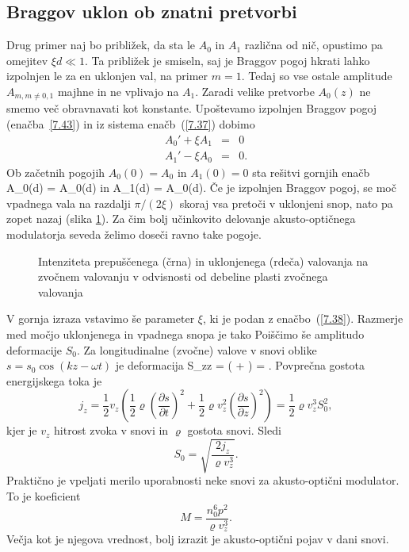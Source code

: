 \subsection*{Braggov uklon ob znatni pretvorbi}
Drug primer naj bo približek, da sta le $A_{0}$ in $A_{1}$ različna od nič, 
opustimo pa omejitev $\xi d\ll 1$. Ta približek je smiseln, saj je 
Braggov pogoj hkrati lahko izpolnjen le za en uklonjen val, na
primer $m=1$. Tedaj so vse ostale amplitude $A_{m, m\ne0,1}$
majhne in ne vplivajo na $A_{1}$. Zaradi velike pretvorbe 
$A_{0}(z)$ ne smemo več obravnavati kot konstante. Upoštevamo 
izpolnjen Braggov pogoj (enačba~\ref{7.43}) in iz sistema enačb~(\ref{7.37})
dobimo
\begin{eqnarray}
A_{0}'+\xi A_{1} & = & 0\nonumber \\
A_{1}'-\xi A_{0} & = & 0.
\end{eqnarray}
Ob začetnih pogojih $A_{0}(0)=A_{0}$ in $A_{1}(0)=0$ sta rešitvi gornjih enačb
\beq
A_{0}(d) = A_{0}\cos (\xi d)
\eeq
in
\beq
A_{1}(d) = A_{0}\sin (\xi d).
\eeq
Če je izpolnjen Braggov pogoj, se moč vpadnega vala na razdalji $\pi/(2\xi)$
skoraj vsa pretoči v uklonjeni snop, nato pa zopet nazaj (slika \ref{s7.10}).
Za čim bolj učinkovito delovanje akusto-optičnega modulatorja seveda
želimo doseči ravno take pogoje.
\begin{figure}[h]
\centering
\def\svgwidth{90truemm} 

\caption{Intenziteta prepuščenega (črna) in uklonjenega (rdeča) valovanja na zvočnem valovanju v
odvisnosti od debeline plasti zvočnega valovanja}
\label{s7.10}
\end{figure}

V gornja izraza vstavimo še parameter $\xi$, ki je podan z enačbo~(\ref{7.38}).
Razmerje med močjo uklonjenega in vpadnega snopa je tako
Poiščimo še amplitudo deformacije $S_0$. Za longitudinalne (zvočne) valove v snovi oblike 
$s = s_0 \cos(kz - \omega t)$ je deformacija 
\beq
S_{zz} = \bigl( + 
\bigr) = .
\eeq
Povprečna gostota energijskega toka je 
\begin{equation}
j_{z}=
\frac{1}{2}v_z \left(\frac{1}{2} \varrho \left(\frac{\partial s}{\partial t}\right)^2
+ \frac{1}{2} \varrho v_z^2\left(\frac{\partial s}{\partial z}\right)^2
\right) = \frac{1}{2} \varrho v_z^3 S_0^2,
\label{7.49}
\end{equation}
kjer je $v_z$ hitrost zvoka v snovi in $\varrho$ gostota snovi. Sledi 
\begin{equation}
S_{0}=\sqrt{\frac{2j_{z}}{\varrho v_{z}^{3}}}.
\label{7.50}
\end{equation}
Praktično je vpeljati merilo uporabnosti neke snovi za akusto-optični modulator. To je koeficient 
\begin{equation}
M=\frac{n_{0}^{6}p^{2}}{\varrho v_{z}^{3}}.
\label{7.51}
\end{equation}
Večja kot je njegova vrednost, bolj izrazit je akusto-optični pojav v dani snovi. 

